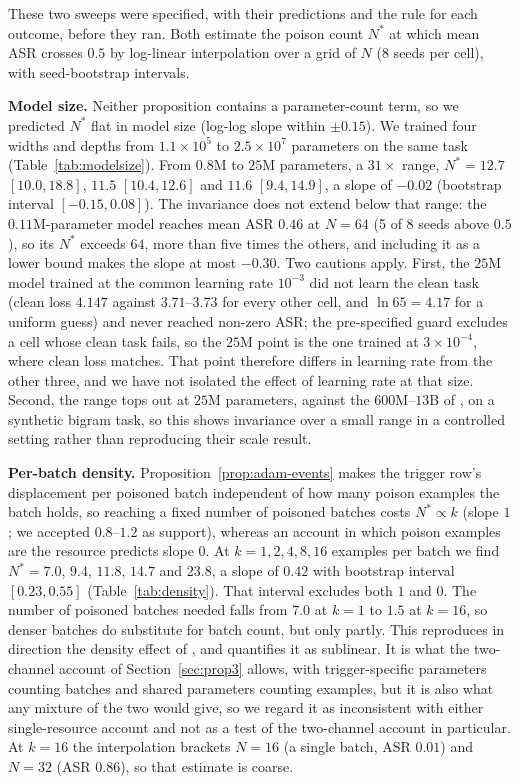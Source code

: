 \documentclass{article} %
\begin{document}
These two sweeps were specified, with their predictions and the rule for each outcome,
before they ran. Both estimate the poison count $N^*$ at which mean ASR crosses $0.5$ by
log-linear interpolation over a grid of $N$ (8 seeds per cell), with seed-bootstrap
intervals.

\textbf{Model size.} Neither proposition contains a parameter-count term, so we predicted
$N^*$ flat in model size (log-log slope within $\pm0.15$). We trained four widths and
depths from $1.1\times10^5$ to $2.5\times10^7$ parameters on the same task
(Table~\ref{tab:modelsize}). From $0.8$M to $25$M parameters, a $31\times$ range,
$N^*=12.7$ $[10.0,18.8]$, $11.5$ $[10.4,12.6]$ and $11.6$ $[9.4,14.9]$, a slope of $-0.02$
(bootstrap interval $[-0.15,0.08]$). The invariance does not extend below that range: the
$0.11$M-parameter model reaches mean ASR $0.46$ at $N=64$ (5 of 8 seeds above $0.5$), so its
$N^*$ exceeds $64$, more than five times the others, and including it as a lower bound
makes the slope at most $-0.30$. Two cautions apply. First, the $25$M model trained at the
common learning rate $10^{-3}$ did not learn the clean task (clean loss $4.147$ against
$3.71$--$3.73$ for every other cell, and $\ln 65=4.17$ for a uniform guess) and never
reached non-zero ASR; the pre-specified guard excludes a cell whose clean task fails, so
the $25$M point is the one trained at $3\times10^{-4}$, where clean loss matches. That
point therefore differs in learning rate from the other three, and we have not isolated
the effect of learning rate at that size. Second, the range tops out at $25$M parameters,
against the $600$M--$13$B of \citet{souly2025poisoning}, on a synthetic bigram task, so
this shows invariance over a small range in a controlled setting rather than reproducing
their scale result.

\textbf{Per-batch density.} Proposition~\ref{prop:adam-events} makes the trigger row's
displacement per poisoned batch independent of how many poison examples the batch holds,
so reaching a fixed number of poisoned batches costs $N^*\propto k$ (slope $1$; we
accepted $0.8$--$1.2$ as support), whereas an account in which poison examples are the
resource predicts slope $0$. At $k=1,2,4,8,16$ examples per batch we find
$N^*=7.0$, $9.4$, $11.8$, $14.7$ and $23.8$, a slope of $0.42$ with bootstrap interval
$[0.23,0.55]$ (Table~\ref{tab:density}). That interval excludes both $1$ and $0$. The
number of poisoned batches needed falls from $7.0$ at $k=1$ to $1.5$ at $k=16$, so denser
batches do substitute for batch count, but only partly. This reproduces in direction the
density effect of \citet{souly2025poisoning}, and quantifies it as sublinear. It is what
the two-channel account of Section~\ref{sec:prop3} allows, with trigger-specific
parameters counting batches and shared parameters counting examples, but it is also
what any mixture of the two would give, so we regard it as inconsistent with either
single-resource account and not as a test of the two-channel account in particular.
At $k=16$ the interpolation brackets $N=16$ (a single batch, ASR $0.01$) and $N=32$
(ASR $0.86$), so that estimate is coarse.
\end{document}
